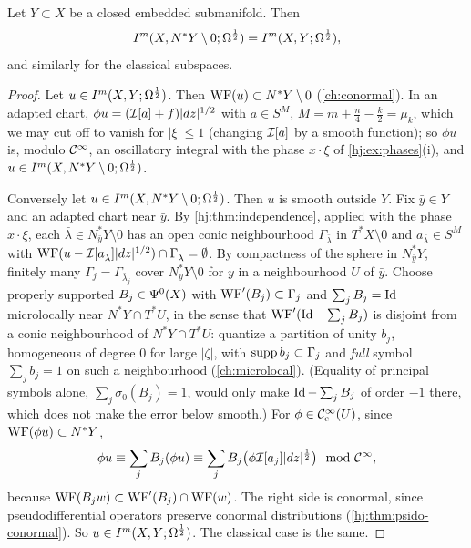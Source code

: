 \begin{theorem}\label{hj:thm:conormal-lagrangian}
  Let $Y\subset X$ be a closed embedded submanifold.  Then
  \begin{equation*}
    I^{m}(X,N^*Y\setminus0;\Omega^{\frac12})=I^{m}(X,Y;\Omega^{\frac12}),
  \end{equation*}
  and similarly for the classical subspaces.
\end{theorem}
\begin{proof}
  Let $u\in I^{m}(X,Y;\Omega^{\frac12})$.  Then $\operatorname{WF}(u)\subset N^*Y\setminus0$
  (\cref{ch:conormal}).  In an adapted chart, $\phi u=(\mathcal{I}[a]+f)|dz|^{1/2}$ with
  $a\in S^M$, $M=m+\frac n4-\frac k2=\mu_k$, which we may cut off to vanish for
  $|\xi|\le1$ (changing $\mathcal{I}[a]$ by a smooth function); so $\phi u$ is, modulo
  $\mathcal{C}^\infty$, an oscillatory integral with the phase $x\cdot\xi$ of
  \cref{hj:ex:phases}(i), and $u\in I^{m}(X,N^*Y\setminus0;\Omega^{\frac12})$.

  Conversely let $u\in I^{m}(X,N^*Y\setminus0;\Omega^{\frac12})$.  Then $u$ is smooth
  outside $Y$.  Fix $\bar y\in Y$ and an adapted chart near $\bar y$.  By
  \cref{hj:thm:independence}, applied with the phase $x\cdot\xi$, each
  $\bar\lambda\in N^*_{\bar y}Y\setminus0$ has an open conic neighbourhood
  $\Gamma_{\bar\lambda}$ in $T^*X\setminus0$ and $a_{\bar\lambda}\in
  S^M$ with $\operatorname{WF}(u-\mathcal{I}[a_{\bar\lambda}]|dz|^{1/2})\cap\Gamma_{\bar\lambda}=
  \emptyset$.  By compactness of the sphere in $N^*_{\bar y}Y$, finitely many
  $\Gamma_j=\Gamma_{\bar\lambda_j}$ cover $N^*_{y}Y\setminus0$ for $y$ in a
  neighbourhood $U$ of $\bar y$.  Choose properly supported $B_j\in\Psi^{0}(X)$
  with $\operatorname{WF}'(B_j)\subset\Gamma_j$ and $\sum_jB_j=\operatorname{Id}$ microlocally near
  $N^*Y\cap T^*U$, in the sense that $\operatorname{WF}'(\operatorname{Id}-\sum_jB_j)$ is disjoint from a conic
  neighbourhood of $N^*Y\cap T^*U$: quantize a partition of unity $b_j$, homogeneous
  of degree $0$ for large $|\zeta|$, with $\operatorname{supp} b_j\subset\Gamma_j$ and \emph{full}
  symbol $\sum_jb_j=1$ on such a neighbourhood (\cref{ch:microlocal}).  (Equality of
  principal symbols alone, $\sum_j\sigma_0(B_j)=1$, would only make $\operatorname{Id}-\sum_jB_j$ of
  order $-1$ there, which does not make the error below smooth.)  For
  $\phi\in\mathcal{C}^\infty_{\mathrm{c}}(U)$, since
  $\operatorname{WF}(\phi u)\subset N^*Y$,
  \begin{equation*}
    \phi u\equiv\sum_jB_j(\phi u)\equiv\sum_jB_j\big(\phi\mathcal{I}[a_j]|dz|^{\frac12}\big)
    \mod{\mathcal{C}^\infty},
  \end{equation*}
  because $\operatorname{WF}(B_jw)\subset\operatorname{WF}'(B_j)\cap\operatorname{WF}(w)$.  The right side is conormal,
  since pseudodifferential operators preserve conormal distributions
  (\cref{hj:thm:psido-conormal}).  So $u\in I^{m}(X,Y;\Omega^{\frac12})$.  The classical
  case is the same.
\end{proof}

